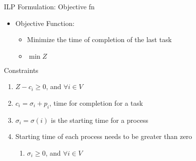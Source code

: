 \documentclass[10pt]{beamer}
\begin{document}
\begin{frame}{ILP Formulation: Objective fn}
    \begin{itemize}
        \item Objective Function:\\
        \begin{itemize}
            \item Minimize the time of completion of the last task
            \item[] $\min Z$
        \end{itemize}
    \end{itemize}
\end{frame}

\begin{frame}{Constraints}
    \begin{enumerate}
        \item $ Z - c_i \geq 0$, and $ \forall i \in V$
        \item $c_i = \sigma_i + p_i$, time for completion for a task
        \item $\sigma_i = \sigma(i)$ is the starting time for a process
        \item Starting time of each process needs to be greater than zero
        \begin{enumerate}
            \item $\sigma_i \geq 0$, and $\forall i \in V$
        \end{enumerate}
    \end{enumerate}
\end{frame}
\end{document}
